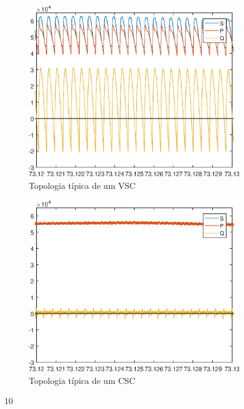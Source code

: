 \begin{figure}[!htb] %
	\centering
	\begin{subfigure}[b]{0.48\textwidth}
		\centering
		\includegraphics[width=\textwidth]{Cap4/Figuras/resultados_unfilt_10.eps}
		\caption{Topologia típica de um VSC} 
		\label{fig:resultados_unfilt_10.eps}
	\end{subfigure}%
		\hfill
	\begin{subfigure}[b]{0.48\textwidth}  
		\centering 
		\includegraphics[width=\textwidth]{Cap4/Figuras/resultados_filt_10.eps}
		\caption{Topologia típica de um CSC}    
		\label{fig:resultados_filt_10.eps}
	\end{subfigure}%
	\caption{10}
	\label{fig:10}
\end{figure}

